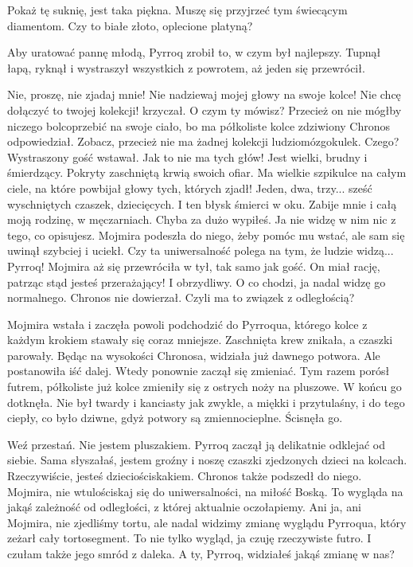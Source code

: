 \begin{dialogue}
\ds{} Pokaż tę suknię, jest taka piękna.
\ds{} Muszę się przyjrzeć tym świecącym diamentom.
\ds{} Czy to białe złoto, oplecione platyną?
\end{dialogue}

Aby uratować pannę młodą, Pyrroq zrobił to, w czym był najlepszy. Tupnął łapą, ryknął i wystraszył wszystkich z powrotem, aż jeden się przewrócił.

\begin{dialogue}
\ds{} Nie, proszę, nie zjadaj mnie! Nie nadziewaj mojej głowy na swoje kolce! Nie chcę dołączyć to twojej kolekcji! \dm{} krzyczał.
\ds{} O czym ty mówisz? Przecież on nie mógłby niczego bolcoprzebić na swoje ciało, bo ma półkoliste kolce \dm{} zdziwiony Chronos odpowiedział. \dm{}
Zobacz, przecież nie ma żadnej kolekcji ludziomózgokulek.
\ds{} Czego? \dm{} Wystraszony gość wstawał. \dm{} Jak to nie ma tych głów! Jest wielki, brudny i śmierdzący. Pokryty zaschniętą krwią swoich ofiar.
Ma wielkie szpikulce na całym ciele, na które powbijał głowy tych, których zjadł! Jeden, dwa, trzy... sześć wyschniętych czaszek, dziecięcych.
I ten błysk śmierci w oku. Zabije mnie i całą moją rodzinę, w męczarniach.
\ds{} Chyba za dużo wypiłeś. Ja nie widzę w nim nic z tego, co opisujesz. \dm{} Mojmira podeszła do niego, żeby pomóc mu wstać, ale sam się uwinął szybciej i uciekł. \dm{}
Czy ta uniwersalność polega na tym, że ludzie widzą... Pyrroq! \dm{} Mojmira aż się przewróciła w tył, tak samo jak gość. \dm{} 
On miał rację, patrząc stąd jesteś przerażający! I obrzydliwy.
\ds{} O co chodzi, ja nadal widzę go normalnego. \dm{} Chronos nie dowierzał.
\ds{} Czyli ma to związek z odległością?
\end{dialogue}

Mojmira wstała i zaczęła powoli podchodzić do Pyrroqua, którego kolce z każdym krokiem stawały się coraz mniejsze. Zaschnięta krew znikała, a czaszki parowały. 
Będąc na wysokości Chronosa, widziała już dawnego potwora.
Ale postanowiła iść dalej. Wtedy ponownie zaczął się zmieniać.
Tym razem porósł futrem, półkoliste już kolce zmieniły się z ostrych noży na pluszowe.
W końcu go dotknęła.
Nie był twardy i kanciasty jak zwykle, a miękki i przytulaśny, i do tego ciepły, co było dziwne, gdyż potwory są zmiennocieplne.
Ścisnęła go.

\begin{dialogue}
\ds{} Weź przestań. Nie jestem pluszakiem. \dm{} Pyrroq zaczął ją delikatnie odklejać od siebie. \dm{}
Sama słyszałaś, jestem groźny i noszę czaszki zjedzonych dzieci na kolcach.
\ds{} Rzeczywiście, jesteś dzieciościskakiem. \dm{} Chronos także podszedł do niego. \dm{} Mojmira, nie wtulościskaj się do uniwersalności, na miłość Boską.
To wygląda na jakąś zależność od odległości, z której aktualnie oczołapiemy. 
Ani ja, ani Mojmira, nie zjedliśmy tortu, ale nadal widzimy zmianę wyglądu Pyrroqua, który zeżarł cały tortosegment.
\ds{} To nie tylko wygląd, ja czuję rzeczywiste futro. I czułam także jego smród z daleka. A ty, Pyrroq, widziałeś jakąś zmianę w nas?
\end{dialogue}

